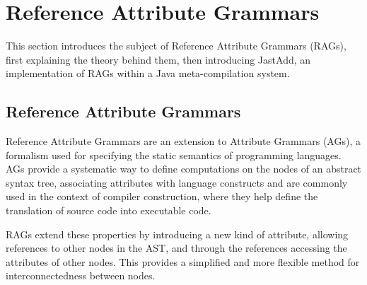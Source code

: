 \documentclass[nofilelist]{cslthse-msc}
\newcommand{\CR}[1]{\textcolor{green!60!black}{[\textbf{CR}:#1]}}
\begin{document}

\section{Reference Attribute Grammars}
This section introduces the subject of Reference Attribute Grammars (RAGs), first explaining the theory behind them, then introducing JastAdd, an implementation of RAGs within a Java meta-compilation system\cite{JastAdd}.

\subsection{Reference Attribute Grammars}
Reference Attribute Grammars are an extension to Attribute Grammars (AGs), a formalism used for specifying the static semantics of programming languages.
AGs provide a systematic way to define computations on the nodes of an abstract syntax tree, associating attributes with language constructs and are commonly used in the context of compiler construction, where they help define the translation of source code into executable code\cite{AGs}.

RAGs extend these properties by introducing a new kind of attribute, allowing references to other nodes in the AST, and through the references accessing the attributes of other nodes.
This provides a simplified and more flexible method for interconnectedness between nodes\cite{RAG}.

\end{document}
